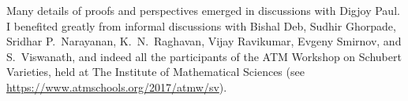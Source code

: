 \documentclass[11pt]{amsproc}
\theoremstyle{definition}
\theoremstyle{example}
\begin{document}
Many details of proofs and perspectives emerged in discussions with Digjoy Paul.
I benefited greatly from informal discussions with Bishal Deb, Sudhir Ghorpade, Sridhar P.~Narayanan, K.~N.~Raghavan, Vijay Ravikumar, Evgeny Smirnov, and  S.~Viswanath, and indeed all the participants of the ATM Workshop on Schubert Varieties, held at The Institute of Mathematical Sciences (see \url{https://www.atmschools.org/2017/atmw/sv}).


\end{document}

